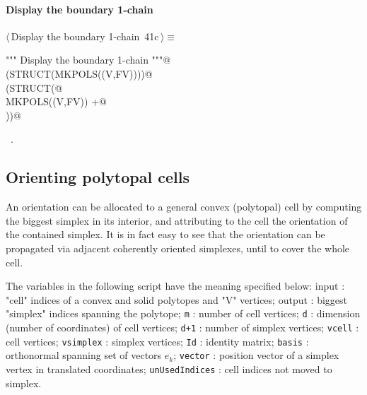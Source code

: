 \documentclass[11pt,oneside]{article}    %
\begin{document}
\paragraph{Display the boundary 1-chain}
\begin{flushleft} \small \label{scrap67}
\protect{}$\langle\,$Display the boundary 1-chain\nobreak\ {\footnotesize 41c}$\,\rangle\equiv$
\vspace{-1ex}
\begin{list}{}{} \item
\mbox{}\verb@""" Display the boundary 1-chain """@\\
\mbox{}\verb@VIEW(STRUCT(MKPOLS((V,FV))))@\\
\mbox{}\verb@VIEW(STRUCT(@\\
\mbox{}\verb@    MKPOLS((V,FV)) +@\\
\mbox{}  ))@\\
\mbox{}\verb@@{\NWsep}
\end{list}
\vspace{-1ex}
\footnotesize\addtolength{\baselineskip}{-1ex}
\begin{list}{}{\setlength{\itemsep}{-\parsep}\setlength{\itemindent}{-\leftmargin}}
\item \NWtxtMacroRefIn\ .
\end{list}
\end{flushleft}



\subsection{Orienting polytopal cells}

An orientation can be allocated to a general convex (polytopal) cell by computing the biggest simplex in its interior, and attributing to the cell the orientation of the contained simplex. 
It is in fact easy to see that the orientation can be propagated via adjacent coherently oriented simplexes, until to cover the whole cell.

The variables in the following script have the meaning specified below:
{input} :  "cell" indices of a convex and solid polytopes and "V" vertices;
{output} :  biggest "simplex" indices spanning the polytope;
{\tt m} : number of cell vertices;
{\tt d} : dimension (number of coordinates) of cell vertices;
{\tt d+1} : number of simplex vertices;
{\tt vcell} : cell vertices;
{\tt vsimplex} : simplex vertices;
{\tt Id} : identity matrix;
{\tt basis} : orthonormal spanning set of vectors $e_k$;
{\tt vector} : position vector of a simplex vertex in translated coordinates;
{\tt unUsedIndices} : cell indices not moved to simplex.
\end{document}
